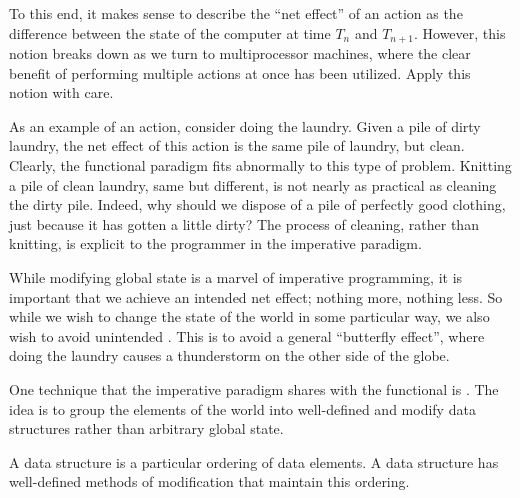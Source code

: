 To this end, it makes sense to describe the ``net effect'' of an action as the
difference between the state of the computer at time $T_n$ and $T_{n+1}$.
However, this notion breaks down as we turn to multiprocessor machines, where
the clear benefit of performing multiple actions at once has been utilized.
Apply this notion with care.


As an example of an action, consider doing the laundry. Given a pile of dirty
laundry, the net effect of this action is the same pile of laundry, but clean.
Clearly, the functional paradigm fits abnormally to this type of problem.
Knitting a pile of clean laundry, same but different, is not nearly as
practical as cleaning the dirty pile. Indeed, why should we dispose of a pile
of perfectly good clothing, just because it has gotten a little dirty? The
process of cleaning, rather than knitting, is explicit to the programmer in the
imperative paradigm.

While modifying global state is a marvel of imperative programming, it is
important that we achieve an intended net effect; nothing more, nothing less.
So while we wish to change the state of the world in some particular way, we
also wish to avoid unintended .  This is to avoid a general
``butterfly effect'', where doing the laundry causes a thunderstorm on the
other side of the globe.



One technique that the imperative paradigm shares with the functional is
. The idea is to group the elements of the world into
well-defined  and modify data structures rather than
arbitrary global state.

\begin{definition}

A data structure is a particular ordering of data elements. A data structure
has well-defined methods of modification that maintain this ordering.

\end{definition}

